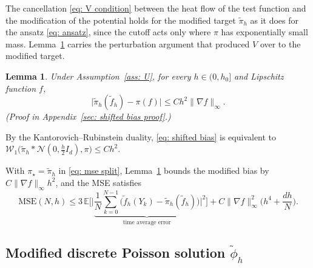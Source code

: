 \documentclass{article}
\newtheorem{lemma}{Lemma}
\newcommand{\Le}{\leqslant}
\newcommand{\MSE}{\mathrm{MSE}}
\newcommand{\norm}[1]{\lVert #1 \rVert}
\numberwithin{equation}{section}
\begin{document}
The cancellation \eqref{eq: V condition} between the heat flow of the test function and the modification of the potential holds for the modified target $\tilde\pi_h$ as it does for the ansatz \eqref{eq: ansatz}, since the cutoff acts only where $\pi$ has exponentially small mass. Lemma~\ref{lem: shifted bias} carries the perturbation argument that produced $V$ over to the modified target.

\begin{lemma}
\label{lem: shifted bias}
    Under Assumption~\ref{ass: U}, for every $h \in (0,h_0]$ and Lipschitz function $f$,
    \begin{equation}
        \bigl| \tilde\pi_h(\tilde f_h) - \pi(f) \bigr| \Le C h^2 \norm{\nabla f}_\infty .
        \label{eq: shifted bias}
    \end{equation}
    \emph{(Proof in Appendix~\ref{sec: shifted bias proof}.)}
\end{lemma}
By the Kantorovich--Rubinstein duality, \eqref{eq: shifted bias} is equivalent to $\mathcal W_1\bigl( \tilde\pi_h * \mathcal N(0, \frac h2 I_d), \pi \bigr) \Le C h^2$.

With $\pi_\star = \tilde\pi_h$ in \eqref{eq: mse split}, Lemma~\ref{lem: shifted bias} bounds the modified bias by $C \norm{\nabla f}_\infty h^2$, and the MSE satisfies
\begin{equation}
    \MSE(N,h) \Le 3\, \mathbb E \Biggl[ \biggl| \underbrace{\frac1N \sum_{k=0}^{N-1} \bigl( \tilde f_h(Y_k) - \tilde\pi_h(\tilde f_h) \bigr)}_{\text{time average error}} \biggr|^2 \Biggr] + C \norm{\nabla f}_\infty^2 \Big(h^4 + \frac{dh}{N}\Big).
    \label{eq: mse split modified}
\end{equation}

\subsection{Modified discrete Poisson solution $\tilde\phi_h$}
\label{subsec: modified poisson}
\end{document}

